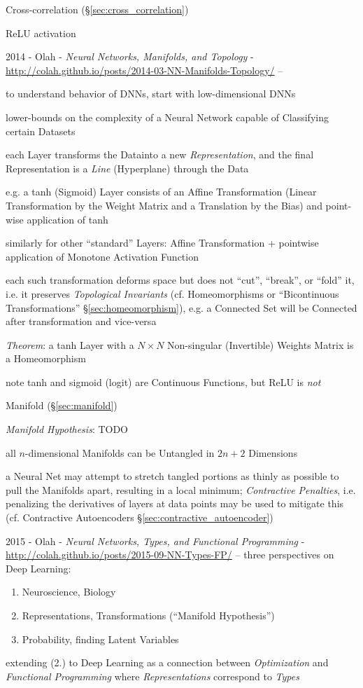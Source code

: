 Cross-correlation (\S\ref{sec:cross_correlation})

ReLU activation

\asterism

2014 - Olah - \emph{Neural Networks, Manifolds, and Topology} -
\url{http://colah.github.io/posts/2014-03-NN-Manifolds-Topology/} --

to understand behavior of DNNs, start with low-dimensional DNNs

lower-bounds on the complexity of a Neural Network capable of Classifying
certain Datasets

each Layer transforms the Datainto a new \emph{Representation}, and the
final Representation is a \emph{Line} (Hyperplane) through the Data

e.g. a tanh (Sigmoid) Layer consists of an Affine Transformation (Linear
Transformation by the Weight Matrix and a Translation by the Bias) and
point-wise application of tanh

similarly for other ``standard'' Layers: Affine Transformation + pointwise
application of Monotone Activation Function

each such transformation deforms space but does not ``cut'', ``break'', or
``fold'' it, i.e. it preserves \emph{Topological Invariants} (cf. Homeomorphisms
or ``Bicontinuous Transformations'' \S\ref{sec:homeomorphism}), e.g. a Connected
Set will be Connected after transformation and vice-versa

\emph{Theorem}: a tanh Layer with a $N \times N$ Non-singular (Invertible)
Weights Matrix is a Homeomorphism

note tanh and sigmoid (logit) are Continuous Functions, but ReLU is \emph{not}

Manifold (\S\ref{sec:manifold})

\emph{Manifold Hypothesis}: TODO

all $n$-dimensional Manifolds can be Untangled in $2n + 2$ Dimensions

a Neural Net may attempt to stretch tangled portions as thinly as possible to
pull the Manifolds apart, resulting in a local minimum; \emph{Contractive
  Penalties}, i.e. penalizing the derivatives of layers at data points may be
used to mitigate this (cf. Contractive Autoencoders
\S\ref{sec:contractive_autoencoder})

\asterism

2015 - Olah - \emph{Neural Networks, Types, and Functional Programming}
- \url{http://colah.github.io/posts/2015-09-NN-Types-FP/} --
three perspectives on Deep Learning:
\begin{enumerate}
  \item Neuroscience, Biology
  \item Representations, Transformations (``Manifold Hypothesis'')
  \item Probability, finding Latent Variables
\end{enumerate}
extending (2.) to Deep Learning as a connection between \emph{Optimization} and
\emph{Functional Programming} where \emph{Representations} correspond to
\emph{Types}

